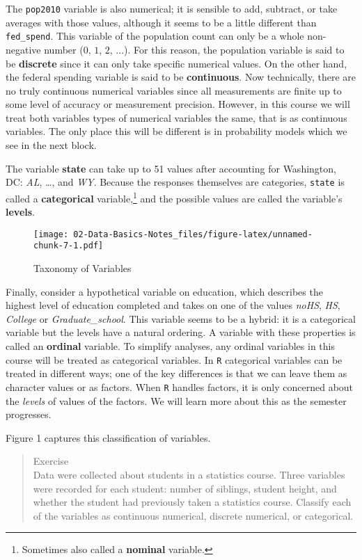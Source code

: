 \documentclass[
]{article}
\begin{document}
The \texttt{pop2010} variable is also numerical; it is sensible to add,
subtract, or take averages with those values, although it seems to be a
little different than \texttt{fed\_spend}. This variable of the
population count can only be a whole non-negative number (\(0\), \(1\),
\(2\), \(...\)). For this reason, the population variable is said to be
\textbf{discrete} since it can only take specific numerical values. On
the other hand, the federal spending variable is said to be
\textbf{continuous}. Now technically, there are no truly continuous
numerical variables since all measurements are finite up to some level
of accuracy or measurement precision. However, in this course we will
treat both variables types of numerical variables the same, that is as
continuous variables. The only place this will be different is in
probability models which we see in the next block.

The variable \textbf{state} can take up to 51 values after accounting
for Washington, DC: \emph{AL}, \ldots{}, and \emph{WY}. Because the
responses themselves are categories, \texttt{state} is called a
\textbf{categorical} variable,\footnote{Sometimes also called a
  \textbf{nominal} variable.} and the possible values are called the
variable's \textbf{levels}.

\begin{figure}
\centering
\texttt{[image: 02-Data-Basics-Notes\_files/figure-latex/unnamed-chunk-7-1.pdf]}
\caption{Taxonomy of Variables}
\end{figure}

Finally, consider a hypothetical variable on education, which describes
the highest level of education completed and takes on one of the values
\emph{noHS}, \emph{HS}, \emph{College} or \emph{Graduate\_school}. This
variable seems to be a hybrid: it is a categorical variable but the
levels have a natural ordering. A variable with these properties is
called an \textbf{ordinal} variable. To simplify analyses, any ordinal
variables in this course will be treated as categorical variables. In
\texttt{R} categorical variables can be treated in different ways; one
of the key differences is that we can leave them as character values or
as factors. When \texttt{R} handles factors, it is only concerned about
the \emph{levels} of values of the factors. We will learn more about
this as the semester progresses.

Figure 1 captures this classification of variables.

\begin{quote}
Exercise\\
Data were collected about students in a statistics course. Three
variables were recorded for each student: number of siblings, student
height, and whether the student had previously taken a statistics
course. Classify each of the variables as continuous numerical, discrete
numerical, or categorical.
\end{quote}
\end{document}
